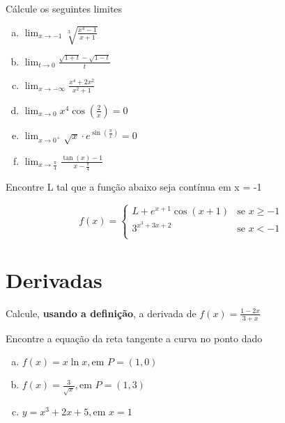 \documentclass[12pt]{exam}
\newcommand{\euler}{e}
\begin{document}
\begin{questions}
\question Cálcule os seguintes limites
    \begin{multicols}{2}
        \begin{enumerate}[(a)]
            \item 
            $\displaystyle \lim_{x\to -1} \sqrt[3]{\frac{x^4 - 1}{x + 1}} $
            \item 
            $\displaystyle \lim_{t\to 0} \frac{\sqrt{1 + t} - \sqrt{1 - t}}{t} $
            \item 
            $\displaystyle \lim_{x\to -\infty} \frac{x^4 + 2x^2}{x^2 + 1} $
            \item 
            $\displaystyle \lim_{x\to 0} x^4 \cos{\left( \frac{2}{x} \right) } = 0 $
            \item 
            $\displaystyle \lim_{x\to 0^+} \sqrt{x} \cdot \euler^{\sin{\left( \frac{\pi}{x} \right) }  } = 0 $
             \item 
            $\displaystyle \lim_{x\to \frac{\pi}{4}} \frac{\tan{\left(x\right)} - 1}{x - \frac{\pi}{4}} $
        \end{enumerate}
    \end{multicols}
    
\question Encontre L tal que a função abaixo seja contínua em x = -1

\begin{equation}
    f(x) = \begin{cases}
        L + e^{x+1}\cos{(x+1)} & \text{se    }  x \geq -1 \\
        3^{x^3 + 3x + 2} & \text{se    } x < -1 \\



    \end{cases}
\end{equation}

\section{Derivadas}



\question Calcule, \textbf{usando a definição}, a derivada de
    $\displaystyle f(x) = \frac{1 - 2x}{3 + x} $

\question Encontre a equação da reta tangente a curva no ponto dado

    \begin{multicols}{2}
        \begin{enumerate}[(a)]
            \item 
            $\displaystyle f(x) = x \ln{x}, \text{em } P = \left( 1, 0\right)$
            \item 
            $\displaystyle f(x) = \frac{3}{\sqrt{x}}, \text{em } P = \left( 1, 3\right)$
            \item 
            $\displaystyle y = x^3 + 2x + 5, \text{em } x = 1$
        \end{enumerate}
    \end{multicols}
    


\end{questions}
\end{document}
